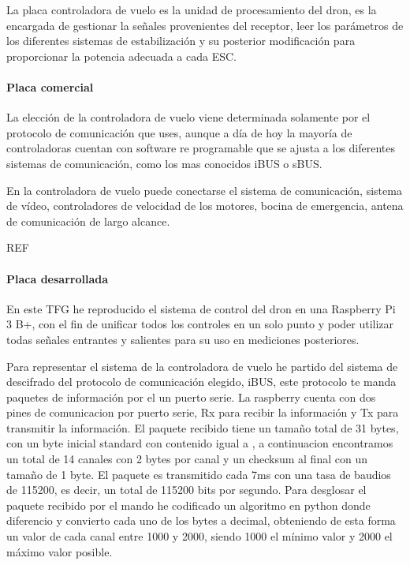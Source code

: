 
	La placa controladora de vuelo es la unidad de procesamiento del dron, es la encargada de gestionar la señales provenientes del receptor, leer los parámetros de los diferentes sistemas de estabilización y su posterior modificación para proporcionar la potencia adecuada a cada ESC.
\paragraph{Placa comercial}
	La elección de la controladora de vuelo viene determinada solamente por el protocolo de comunicación que uses, aunque a día de hoy la mayoría de controladoras cuentan con software re programable que se ajusta a los diferentes sistemas de comunicación, como los mas conocidos iBUS o sBUS.

	En la controladora de vuelo puede conectarse el sistema de comunicación, sistema de vídeo, controladores de velocidad de los motores, bocina de emergencia, antena de comunicación de largo alcance.

REF %

\paragraph{Placa desarrollada}
	En este TFG he reproducido el sistema de control del dron en una Raspberry Pi 3 B+, con el fin de unificar todos los controles en un solo punto y poder utilizar todas señales entrantes y salientes para su uso en mediciones posteriores.
	
	Para representar el sistema de la controladora de vuelo he partido del sistema de descifrado del protocolo de comunicación elegido, iBUS, este protocolo te manda paquetes de información por el un puerto serie. La raspberry cuenta con dos pines de comunicacion por puerto serie, Rx para recibir la información y Tx para transmitir la información.
El paquete recibido tiene un tamaño total de 31 bytes, con un byte inicial standard con contenido igual a , a continuacion encontramos un total de 14 canales con 2 bytes por canal y un checksum al final con un tamaño de 1 byte. El paquete es transmitido cada 7ms con una tasa de baudios de 115200, es decir, un total de 115200 bits por segundo.
Para desglosar el paquete recibido por el mando he codificado un algoritmo en python donde diferencio y convierto cada uno de los bytes a decimal, obteniendo de esta forma un valor de cada canal entre 1000 y 2000, siendo 1000 el mínimo valor y 2000 el máximo valor posible.


